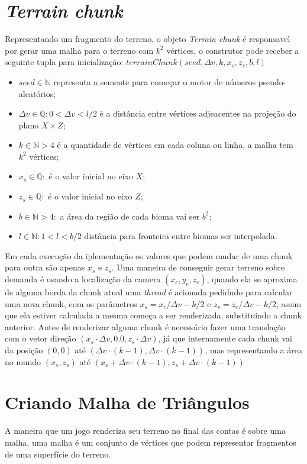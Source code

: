 \section{\textit{Terrain chunk}}
Representando um fragmento do terreno, o objeto \textit{Terrain chunk} é responsavel
por gerar uma malha para o terreno com $k^2$ vértices, o construtor pode receber 
a seguinte tupla para inicialização: 
$terrainChunk(seed, \Delta{v}, k, x_{s}, z_{s}, b, l)$
\begin{itemize}
    \item $seed \in \mathbb{N}$ representa a semente para começar o motor de números
    pseudo-aleatórios;
    \item $\Delta{v} \in \mathbb{Q}:0 < \Delta{v} < l/2$ é a distância entre vértices adjeacentes na
    projeção do plano $X \times Z$;
    \item $k \in \mathbb{N}>4$ é a quantidade de vértices em cada coluna ou 
    linha, a malha tem $k^2$ vértices;
    \item $x_{s} \in \mathbb{Q}:$ é o valor inicial no eixo $X$;
    \item $z_{s} \in \mathbb{Q}:$ é o valor inicial no eixo $Z$;
    \item $b \in \mathbb{N}>4:$ a área da região de cada bioma vai ser $b^2$;
    \item $l \in \mathbb{N}:1 < l < b/2$ distância para fronteira entre biomas ser interpolada.
\end{itemize}


Em cada execução da iplementação os valores que podem mudar de uma chunk para 
outra são apenas $x_{s}$ e $z_{s}$. Uma maneira de conseguir gerar terreno sobre demanda
é usando a localização da camera $(x_{c}, y_{c}, z_{c})$, quando ela se
aproxima de alguma borda da chunk atual
uma \textit{thread} é acionada pedidndo para calcular uma nova chunk, com os parâmetros
$x_{s} = x_{c}/\Delta{v} - k/2$ e $z_{s} = z_{c}/\Delta{v} - k/2$, assim que ela
estiver calculada a mesma começa a ser renderizada, substituindo a chunk anterior.
Antes de renderizar alguma chunk é necessário fazer uma translação com o vetor direção 
$(x_{s} \cdot \Delta{v}, 0.0, z_{s} \cdot \Delta{v})$, já que internamente cada chunk vai 
da posição $(0, 0)$ até $(\Delta{v} \cdot (k-1), \Delta{v} \cdot (k-1))$, mas representando a área 
no mundo $(x_{s}, z_{s})$ até $(x_{s} + \Delta{v} \cdot (k-1), z_{s} + \Delta{v} \cdot (k-1))$

\section{Criando Malha de Triângulos}
A maneira que um jogo renderiza seu terreno no final das contas é sobre uma
malha, uma malha é um conjunto de vértices que podem representar fragmentos
de uma superfície do terreno.

